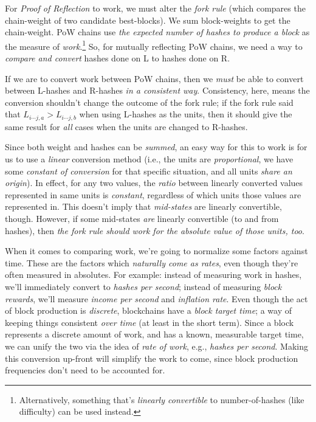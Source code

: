 

For \emph{Proof of Reflection} to work, we must alter the \emph{fork rule} (which compares the chain-weight of two candidate best-blocks).
We sum block-weights to get the chain-weight.
PoW chains use \emph{the expected number of hashes to produce a block} as the measure of \emph{work}.\footnote{Alternatively, something that's \emph{linearly convertible} to number-of-hashes (like difficulty) can be used instead.}
So, for mutually reflecting PoW chains, we need a way to \emph{compare and convert} hashes done on L to hashes done on R.

If we are to convert work between PoW chains, then we \emph{must} be able to convert between L-hashes and R-hashes \emph{in a consistent way}.
Consistency, here, means the conversion shouldn't change the outcome of the fork rule;
if the fork rule said that $L_{i \cdots j,a} > L_{i \cdots j,b}$ when using L-hashes as the units, then it should give the same result for \emph{all} cases when the units are changed to R-hashes.



Since both weight and hashes can be \emph{summed}, an easy way for this to work is for us to use a \emph{linear} conversion method (i.e., the units are \emph{proportional}, we have some \emph{constant of conversion} for that specific situation, and all units \emph{share an origin}).
In effect, for any two values, the \emph{ratio} between linearly converted values represented in same units is \emph{constant}, regardless of which units those values are represented in.
This doesn't imply that \emph{mid-states} are linearly convertible, though.
However, if some mid-states \emph{are} linearly convertible (to and from hashes), then \emph{the fork rule should work for the absolute value of those units, too}.

When it comes to comparing work, we're going to normalize some factors against time.
These are the factors which \emph{naturally come as rates}, even though they're often measured in absolutes.
For example: instead of measuring work in hashes, we'll immediately convert to \emph{hashes per second};
instead of measuring \emph{block rewards}, we'll measure \emph{income per second} and \emph{inflation rate}.
Even though the act of block production is \emph{discrete}, blockchains have a \emph{block target time}; a way of keeping things consistent \emph{over time} (at least in the short term).
Since a block represents a discrete amount of work, and has a known, measurable target time, we can unify the two via the idea of \emph{rate of work}, e.g., \emph{hashes per second}.
Making this conversion up-front will simplify the work to come, since block production frequencies don't need to be accounted for.

